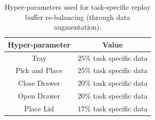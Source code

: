 \begin{table}[h!]
    \centering
    \begin{tabular}{c|c}
    \hline
    \textbf{Hyper-parameter} & \textbf{Value} \\
    \hline
    Tray & $25 \%$ task specific data\\
    Pick and Place & $25 \%$ task specific data\\
    Close Drawer & $20 \%$ task specific data\\
    Open Drawer & $20 \%$ task specific data\\
    Place Lid & $17 \%$ task specific data\\
    \hline
    \end{tabular}
\caption{Hyper-parameters used for task-specific replay buffer re-balancing (through data augmentation).}
\label{table:task-data-hyperparams}
\end{table}

